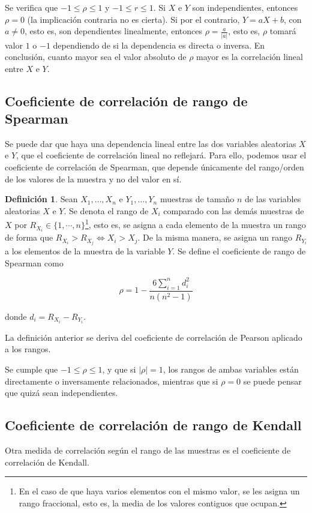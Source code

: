 \documentclass[a4paper,12pt]{report}
\theoremstyle{definition}
\newtheorem{dfn}{Definición}
\begin{document}
Se verifica que $-1 \leq \rho \leq 1$ y $-1 \leq r \leq 1$. Si $X$ e $Y$ son independientes, entonces $\rho = 0$ (la implicación contraria no es cierta). Si por el contrario, $Y = aX + b$, con $a \neq 0$, esto es, son dependientes linealmente, entonces $\rho = \frac{a}{\lvert a \rvert}$, esto es, $\rho$ tomará valor $1$ o $-1$ dependiendo de si la dependencia es directa o inversa. En conclusión, cuanto mayor sea el valor absoluto de $\rho$ mayor es la correlación lineal entre $X$ e $Y$.

\subsection{Coeficiente de correlación de rango de Spearman}
Se puede dar que haya una dependencia lineal entre las dos variables aleatorias $X$ e $Y$, que el coeficiente de correlación lineal no reflejará. Para ello, podemos usar el coeficiente de correlación de Spearman, que depende únicamente del rango/orden de los valores de la muestra y no del valor en sí.

\begin{dfn}
  Sean $X_1, \ldots, X_n$ e $Y_1, \ldots, Y_n$ muestras de tamaño $n$ de las variables aleatorias $X$ e $Y$. Se denota el rango de $X_i$ comparado con las demás muestras de $X$ por $R_{X_i} \in \lbrace 1, \cdots, n \rbrace$\footnote{En el caso de que haya varios elementos con el mismo valor, se les asigna un rango fraccional, esto es, la media de los valores contiguos que ocupan.}, esto es, se asigna a cada elemento de la muestra un rango de forma que $R_{X_i} > R_{X_j} \Leftrightarrow X_i > X_j$.
  De la misma manera, se asigna un rango $R_{Y_i}$ a los elementos de la muestra de la variable $Y$.
  Se define el coeficiente de rango de Spearman como

  $$ \rho = 1 - \frac{6\sum_{i=1}^n d_i^2}{n(n^2-1)} $$

  donde $d_i = R_{X_i}-R_{Y_i}$.
\end{dfn}

La definición anterior se deriva del coeficiente de correlación de Pearson aplicado a los rangos\cite{hardle2015introduction}.

Se cumple que $-1 \leq \rho \leq 1$, y que si $\lvert \rho \rvert = 1$, los rangos de ambas variables están directamente o inversamente relacionados, mientras que si $\rho = 0$ se puede pensar que quizá sean independientes.

\subsection{Coeficiente de correlación de rango de Kendall}
Otra medida de correlación según el rango de las muestras es el coeficiente de correlación de Kendall.
\end{document}
